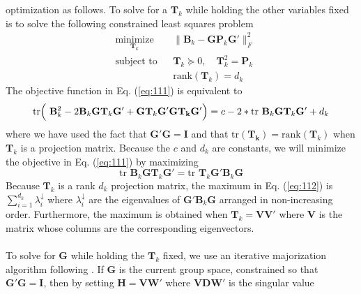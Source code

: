 optimization as follows. To solve for a $\mathbf{T}_k$ while holding
the other variables fixed is to solve the following constrained least
squares problem
\begin{equation}
  \label{eq:111}
  \begin{aligned}
	& \underset{\mathbf{T}_k}{\text{minimize}}
	& &  \| \mathbf{B}_k - \mathbf{G}
\mathbf{P}_k \mathbf{G}' \|_F^2 \\
	& \text{subject to}
	& & \mathbf{T}_k \succeq 0, \quad \mathbf{T}_k^2 = \mathbf{P}_k \\
    & & & \mathrm{rank}(\mathbf{T}_k) = d_k
  \end{aligned}
\end{equation}
The objective function in Eq. (\ref{eq:111}) is equivalent to 
\begin{equation*}
  \mathrm{tr}\Bigl(\,\, \mathbf{B}_k^2 - 2
  \mathbf{B}_k \mathbf{G} \mathbf{T}_{k} \mathbf{G}'
  + \mathbf{G} \mathbf{T}_k \mathbf{G}' \mathbf{G} \mathbf{T_k}
  \mathbf{G}'\Bigr) = c - 2 * \mathrm{tr} \,\, \mathbf{B}_k
  \mathbf{G} \mathbf{T}_{k} \mathbf{G}' + d_k
\end{equation*}
where we have used the fact that $\mathbf{G}' \mathbf{G} = \mathbf{I}$
and that $\mathrm{tr}(\mathbf{T_k}) =
\mathrm{rank}(\mathbf{T}_k)$ when $\mathbf{T}_k$ is a projection
matrix. Because the $c$ and $d_k$ are constants, we will minimize the
objective in Eq. (\ref{eq:111}) by maximizing
\begin{equation}
  \label{eq:112}
  \mathrm{tr} \,\, \mathbf{B}_k \mathbf{G}
  \mathbf{T}_{k} \mathbf{G}' = \mathrm{tr} \,\, \mathbf{T}_k \mathbf{G}'
  \mathbf{B}_k \mathbf{G}
\end{equation}
Because $\mathbf{T}_k$ is a rank $d_k$ projection matrix, the maximum in
Eq. (\ref{eq:112}) is $\sum_{i=1}^{d_k} \lambda_{i}^{\downarrow}$ where
$\lambda_{i}^{\downarrow}$ are the eigenvalues of $\mathbf{G}'
\mathbf{B}_k \mathbf{G}$ arranged in
non-increasing order. Furthermore, the maximum is
obtained when $\mathbf{T}_k = \mathbf{V}
\mathbf{V}'$ where $\mathbf{V}$ is the matrix whose columns are the
corresponding eigenvectors. \\ \\
%
\noindent
To solve for $\mathbf{G}$ while holding the $\mathbf{T}_k$ fixed, we
use an iterative majorization algorithm following
\citet{kiers90:_major}. If $\mathbf{G}$ is the
current group space, constrained so that $\mathbf{G}' \mathbf{G} =
\mathbf{I}$, then by setting $\mathbf{H} = \mathbf{V} \mathbf{W}'$
where $\mathbf{V} \mathbf{D} \mathbf{W}'$ is the singular value
